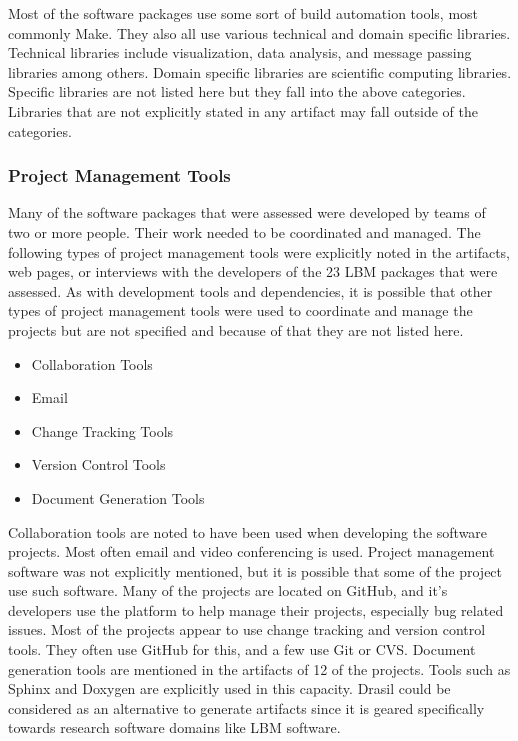 \documentclass[12pt, notitlepage]{article}
\begin{document}
Most of the software packages use some sort of build automation tools, most commonly Make. They also all use various technical and domain specific libraries. Technical libraries include visualization, data analysis, and message passing libraries among others. Domain specific libraries are scientific computing libraries. Specific libraries are not listed here but they fall into the above categories. Libraries that are not explicitly stated in any artifact may fall outside of the categories. 

\subsubsection{Project Management Tools}

Many of the software packages that were assessed were developed by teams of two or more people. Their work needed to be coordinated and managed. The following types of project management tools were explicitly noted in the artifacts, web pages, or interviews with the developers of the 23 LBM packages that were assessed. As with development tools and dependencies, it is possible that other types of project management tools were used to coordinate and manage the projects but are not specified and because of that they are not listed here.

\begin{singlespace}
	\begin{multicols}{2}	
		\begin{itemize}
			\item Collaboration Tools
			\item Email
			\item Change Tracking Tools
			\item Version Control Tools
			\item Document Generation Tools
		\end{itemize}
	\end{multicols}
\end{singlespace}

Collaboration tools are noted to have been used when developing the software projects. Most often email and video conferencing is used. Project management software was not explicitly mentioned, but it is possible that some of the project use such software. Many of the projects are located on GitHub, and it's developers use the platform to help manage their projects, especially bug related issues. Most of the projects appear to use change tracking and version control tools. They often use GitHub for this, and a few use Git or CVS. Document generation tools are mentioned in the artifacts of 12 of the projects. Tools such as Sphinx and Doxygen are explicitly used in this capacity. Drasil could be considered as an alternative to generate artifacts since it is geared specifically towards research software domains like LBM software. 
\end{document}
